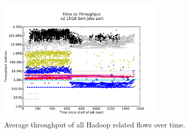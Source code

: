 \begin{figure}
\begin{minipage}{.5\textwidth}
  \label{fig:test2}
\end{minipage}
\end{figure}

\begin{figure}
\centering
\includegraphics[width=0.7\textwidth]{figures/clock_v_throughput_port.pdf}
\caption{Average throughput of all Hadoop related flows over time.}
\label{fig:tput}
\end{figure}
